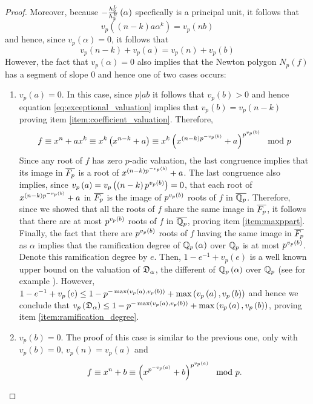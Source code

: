 \documentclass[../main.tex]{subfiles}
\begin{document}
\begin{proof}
  Moreover, because $-\frac{h_{2}^L}{h_{2}^R}\left( \alpha \right)$ specfically is a principal unit, it follows that 
  $$v_p\left( \left( n - k \right) a \alpha^k \right) = v_p\left( nb \right)$$ 
  and hence, since $v_p\left( \alpha \right) = 0$, it follows that
  \begin{equation}
    v_p\left( n - k \right) + v_p\left( a \right) = 
    v_p\left( n \right) + v_p\left( b \right)
    \label{eq:exceptional_valuation}
  \end{equation}
  However, the fact that $v_p\left( \alpha \right) = 0$ also implies that the Newton polygon $N_p\left( f \right)$ has a segment of slope $0$ and hence one of two cases occurs:
  \begin{enumerate}
    \item $v_p\left( a \right) = 0$. 
    In this case, since $p|ab$ it follows that $v_p\left( b \right) > 0$ and hence equation \ref{eq:exceptional_valuation} implies that $v_p\left( b \right) = v_p\left( n - k \right)$ proving item \ref{item:coefficient_valuation}.
    Therefore, 
    \[
      f \equiv 
      x^n + ax^k \equiv 
      x^k\left( x^{n-k} + a \right) 
      \equiv
      x^k \left( x^{\left( n-k \right)p^{-v_p\left( b \right)}} + a \right)^{p^{v_p\left( b \right)}} 
      \mod p 
    \]
    Since any \ex root of $f$ has zero $p$-adic valuation, the last congruence implies that its image in $\overline{F_p}$ is a root of $x^{\left( n-k \right)p^{-v_p\left( b \right)}} + a$.
    The last congruence also implies, since $v_p\left( a \right) = v_p\left( \left( n-k \right)p^{v_p\left( b \right)} \right) = 0$, that each root of $x^{\left( n-k \right)p^{-v_p\left( b \right)}} + a$ in $\overline{F_p}$ is the image of $p^{v_p\left( b \right)}$ roots of $f$ in $\overline{\mathbb{Q}_p}$.
    Therefore, since we showed that all the \ex roots of $f$ share the same image in $\overline{F_p}$, it follows that there are at most $p^{v_p\left( b \right)}$ \ex roots of $f$ in $\overline{\mathbb{Q}_p}$, proving item \ref{item:maxppart}.
    Finally, the fact that there are $p^{v_p\left( b \right)}$ roots of $f$ having the same image in $\overline{F_p}$ as $\alpha$ implies that the ramification degree of $\mathbb{Q}_p\left( \alpha \right)$ over $\mathbb{Q}_p$ is at most $p^{v_p\left( b \right)}$.
    Denote this ramification degree by $e$.
    Then, $1-e^{-1} + v_p\left( e \right)$ is a well known upper bound on the valuation of $\mathfrak{D}_\alpha$, the different of $\mathbb{Q}_p\left( \alpha \right)$ over $\mathbb{Q}_p$ (see for example \cite[Remark 1 to Proposition 13 of Chapter. III \S 7]{SerreLocalFields}).
    However, $1 - e^{-1} + v_p\left( e \right) \leq 1 - p^{-\max\left( v_p\left( a \right), v_p\left( b \right) \right)} + \max\left( v_p\left( a \right), v_p\left( b \right) \right)$ and hence we conclude that $v_p\left( \mathfrak{D}_\alpha \right) \leq 1 - p^{-\max\left( v_p\left( a \right), v_p\left( b \right) \right)} + \max\left( v_p\left( a \right), v_p\left( b \right) \right)$, proving item \ref{item:ramification_degree}. 
    \item $v_p\left( b \right) = 0$.
    The proof of this case is similar to the previous one, only with $v_p\left( b \right) = 0$, $v_p\left( n \right) = v_p\left( a \right)$ and 
    \[
      f \equiv 
      x^n + b \equiv 
      \left( x^{p^{-v_p\left( a \right)}} + b \right)^{p^{v_p\left( a \right)}} 
      \mod p.
    \]
  \end{enumerate}
\end{proof}
\end{document}

